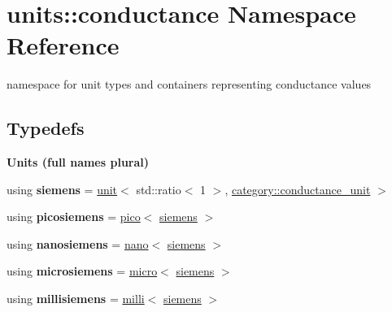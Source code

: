 \hypertarget{namespaceunits_1_1conductance}{}\section{units\+:\+:conductance Namespace Reference}
\label{namespaceunits_1_1conductance}


namespace for unit types and containers representing conductance values  


\subsection*{Typedefs}
\begin{Indent}{\bf Units (full names plural)}\par
\begin{DoxyCompactItemize}
\item 
\hypertarget{namespaceunits_1_1conductance_aef193becf429415409db0139914185e5}{}using {\bfseries siemens} = \hyperlink{structunits_1_1unit}{unit}$<$ std\+::ratio$<$ 1 $>$, \hyperlink{namespaceunits_1_1category_a15b4c4ec156dfa3f11f5123389182e4e}{category\+::conductance\+\_\+unit} $>$\label{namespaceunits_1_1conductance_aef193becf429415409db0139914185e5}

\item 
\hypertarget{namespaceunits_1_1conductance_a1bfde04b0f5d83546133c612022ae781}{}using {\bfseries picosiemens} = \hyperlink{group___unit_manipulators_ga82a8d14a3e0877a375a66b64c45baab9}{pico}$<$ \hyperlink{structunits_1_1unit}{siemens} $>$\label{namespaceunits_1_1conductance_a1bfde04b0f5d83546133c612022ae781}

\item 
\hypertarget{namespaceunits_1_1conductance_abaa575ec2d9323d7ccab46ea571cc0e7}{}using {\bfseries nanosiemens} = \hyperlink{group___unit_manipulators_ga1c25c3c1d6c1f3aed3fd1ecf043110d5}{nano}$<$ \hyperlink{structunits_1_1unit}{siemens} $>$\label{namespaceunits_1_1conductance_abaa575ec2d9323d7ccab46ea571cc0e7}

\item 
\hypertarget{namespaceunits_1_1conductance_a3b473f5b8f54cbdceed9fe70fc87b6dd}{}using {\bfseries microsiemens} = \hyperlink{group___unit_manipulators_gaea53c906ec805110b93f02db4a961971}{micro}$<$ \hyperlink{structunits_1_1unit}{siemens} $>$\label{namespaceunits_1_1conductance_a3b473f5b8f54cbdceed9fe70fc87b6dd}

\item 
\hypertarget{namespaceunits_1_1conductance_adcaefe3d867e4f2a81138a850e9d79b9}{}using {\bfseries millisiemens} = \hyperlink{group___unit_manipulators_gaec9d1c320e180eb59f3cb3094d8079dd}{milli}$<$ \hyperlink{structunits_1_1unit}{siemens} $>$\label{namespaceunits_1_1conductance_adcaefe3d867e4f2a81138a850e9d79b9}


\end{DoxyCompactItemize}
\end{Indent}

